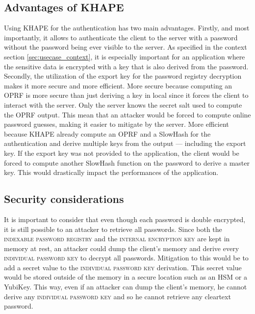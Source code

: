 \documentclass[../report.tex]{subfiles}
\begin{document}
\subsection{Advantages of KHAPE}
Using KHAPE for the authentication has two main advantages.
Firstly, and most importantly, it allows to authenticate the client to the server with a password without the password being ever visible to the server. As specified in the context section \ref{sec:usecase_context}, it is especially important for an application where the sensitive data is encrypted with a key that is also derived from the password.
Secondly, the utilization of the export key for the password registry decryption makes it more secure and more efficient.
More secure because computing an OPRF is more secure than just deriving a key in local since it forces the client to interact with the server. Only the server knows the secret salt used to compute the OPRF output. 
This mean that an attacker would be forced to compute online password guesses, making it easier to mitigate by the server.
More efficient because KHAPE already compute an OPRF and a SlowHash for the authentication and derive multiple keys from the output --- including the export key.
If the export key was not provided to the application, the client would be forced to compute another SlowHash function on the password to derive a master key. This would drastically impact the performances of the application.


\subsection{Security considerations}
It is important to consider that even though each password is double encrypted, it is still possible to an attacker to retrieve all passwords. Since both the \textsc{indexable password registry} and the \textsc{internal encryption key} are kept in memory at rest, an attacker could dump the client's memory and derive every \textsc{individual password key} to decrypt all passwords.
Mitigation to this would be to add a secret value to the \textsc{individual password key} derivation. This secret value would be stored outside of the memory in a secure location such as an HSM or a YubiKey. This way, even if an attacker can dump the client's memory, he cannot derive any \textsc{individual password key} and so he cannot retrieve any cleartext password. 

% 
% 
% 
\end{document}
